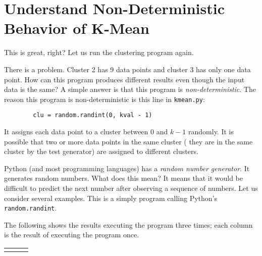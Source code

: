 \section{Understand Non-Deterministic Behavior of K-Mean}

This is great, right? Let us run the clustering program again.

\resetlinenumber[1]
\linenumbers
\begin{tt}
  
\end{tt}
\nolinenumbers

There is a problem. Cluster 2 has 9 data points and cluster 3 has
only one data point. How can this program produces different
results even though the input data is the same?  A simple
answer is that this program is {\it non-deterministic}.
The reason this program is non-deterministic is this line in
{\tt kmean.py}:

\begin{verbatim}
        clu = random.randint(0, kval - 1)
\end{verbatim}


It assigns each data point to a cluster between $0$ and $k-1$
randomly.  It is possible that two or more data points in the same
cluster ( they are in the same cluster by the test generator) are
assigned to different clusters.

Python (and most programming languages) has a {\it random number
  generator}.  It generates random numbers. What does this mean?  It
means that it would be difficult to predict the next number after
observing a sequence of numbers.  
Let us consider several examples. This is a simply program calling
Python's {\tt random.randint}. 

\resetlinenumber[1]
\linenumbers
\begin{tt}
  
\end{tt}
\nolinenumbers

The following shows the results
executing the program three times; each column is the result of
executing the program once.

\begin{tabular}{p{1in}p{1in}p{1in}}
\begin{tt}
  
\end{tt}
&
\begin{tt}
  
\end{tt}

&
\begin{tt}
  
\end{tt}

\end{tabular}

